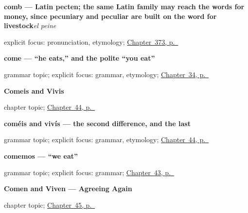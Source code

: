 \noindent\begin{minipage}[t]{\linewidth}
\raggedright
\textbf{comb — Latin pecten; the same Latin family may reach the words for money, since pecuniary and peculiar are built on the word for livestock}\enspace\emph{el peine}\par
\footnotesize explicit focus: pronunciation, etymology; \hyperref[ch:el-oro-y-la-botella]{Chapter~373, p.~\pageref*{ch:el-oro-y-la-botella}}
\end{minipage}\par\smallskip

\noindent\begin{minipage}[t]{\linewidth}
\raggedright
\textbf{come — \textquotedblleft{}he eats,\textquotedblright{} and the polite \textquotedblleft{}you eat\textquotedblright{}}\par
\footnotesize grammar topic; explicit focus: grammar, etymology; \hyperref[ch:spanish-comer]{Chapter~34, p.~\pageref*{ch:spanish-comer}}
\end{minipage}\par\smallskip

\noindent\begin{minipage}[t]{\linewidth}
\raggedright
\textbf{Comeis and Vivis}\par
\footnotesize chapter topic; \hyperref[ch:spanish-er-ir-2pl]{Chapter~44, p.~\pageref*{ch:spanish-er-ir-2pl}}
\end{minipage}\par\smallskip

\noindent\begin{minipage}[t]{\linewidth}
\raggedright
\textbf{coméis and vivís — the second difference, and the last}\par
\footnotesize grammar topic; explicit focus: grammar, etymology; \hyperref[ch:spanish-er-ir-2pl]{Chapter~44, p.~\pageref*{ch:spanish-er-ir-2pl}}
\end{minipage}\par\smallskip

\noindent\begin{minipage}[t]{\linewidth}
\raggedright
\textbf{comemos — \textquotedblleft{}we eat\textquotedblright{}}\par
\footnotesize grammar topic; explicit focus: grammar; \hyperref[ch:spanish-er-ir-1pl]{Chapter~43, p.~\pageref*{ch:spanish-er-ir-1pl}}
\end{minipage}\par\smallskip

\noindent\begin{minipage}[t]{\linewidth}
\raggedright
\textbf{Comen and Viven --- Agreeing Again}\par
\footnotesize chapter topic; \hyperref[ch:spanish-er-ir-3pl]{Chapter~45, p.~\pageref*{ch:spanish-er-ir-3pl}}
\end{minipage}\par\smallskip

